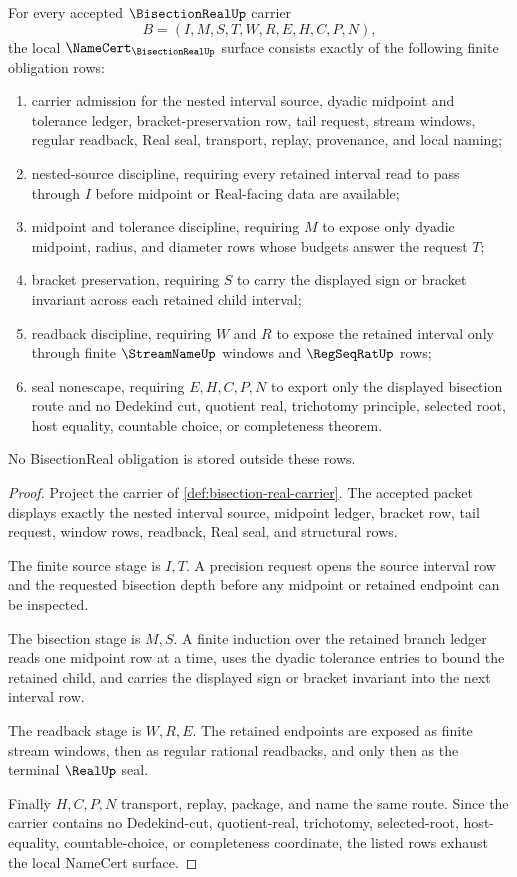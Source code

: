 \begin{theorem}
\label{thm:bisection-real-namecert-obligations}
For every accepted $\BisectionRealUp$ carrier
$$
B=(I,M,S,T,W,R,E,H,C,P,N),
$$
the local $\NameCert_{\BisectionRealUp}$ surface consists exactly of the following finite obligation rows:
\begin{enumerate}
\item carrier admission for the nested interval source, dyadic midpoint and tolerance ledger, bracket-preservation row, tail request, stream windows, regular readback, Real seal, transport, replay, provenance, and local naming;
\item nested-source discipline, requiring every retained interval read to pass through $I$ before midpoint or Real-facing data are available;
\item midpoint and tolerance discipline, requiring $M$ to expose only dyadic midpoint, radius, and diameter rows whose budgets answer the request $T$;
\item bracket preservation, requiring $S$ to carry the displayed sign or bracket invariant across each retained child interval;
\item readback discipline, requiring $W$ and $R$ to expose the retained interval only through finite $\StreamNameUp$ windows and $\RegSeqRatUp$ rows;
\item seal nonescape, requiring $E,H,C,P,N$ to export only the displayed bisection route and no Dedekind cut, quotient real, trichotomy principle, selected root, host equality, countable choice, or completeness theorem.
\end{enumerate}
No BisectionReal obligation is stored outside these rows.
\end{theorem}
\begin{proof}
Project the carrier of \autoref{def:bisection-real-carrier}. The accepted packet displays exactly the nested interval source, midpoint ledger, bracket row, tail request, window rows, readback, Real seal, and structural rows.

The finite source stage is $I,T$. A precision request opens the source interval row and the requested bisection depth before any midpoint or retained endpoint can be inspected.

The bisection stage is $M,S$. A finite induction over the retained branch ledger reads one midpoint row at a time, uses the dyadic tolerance entries to bound the retained child, and carries the displayed sign or bracket invariant into the next interval row.

The readback stage is $W,R,E$. The retained endpoints are exposed as finite stream windows, then as regular rational readbacks, and only then as the terminal $\RealUp$ seal.

Finally $H,C,P,N$ transport, replay, package, and name the same route. Since the carrier contains no Dedekind-cut, quotient-real, trichotomy, selected-root, host-equality, countable-choice, or completeness coordinate, the listed rows exhaust the local NameCert surface.
\end{proof}

